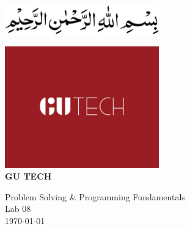 \documentclass[12pt]{article}
\begin{document}
\begin{titlepage}
    \centering

    \vspace*{-8em}
    \includegraphics[width=0.5\textwidth]{Bismillah.png}%
    \vspace*{5em}

    
    \vspace*{1cm}

     \includegraphics[width=0.5\textwidth]{GU Tech 1685x1330.png}\\[2cm]

    \MakeUppercase{\Huge \textbf{GU TECH}}\\[1.5ex]
    
    \vspace*{1cm}
    
    \Huge Problem Solving \& Programming Fundamentals \\[1.5ex]
    \LARGE Lab 08 \\[2cm]


    {\Large \today}\\[1cm]
    
\end{titlepage}

\newpage


\end{document}
